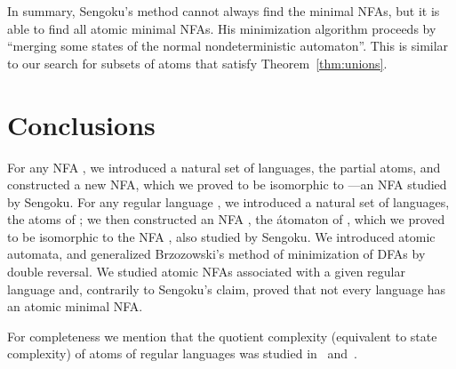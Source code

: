 \documentclass[preprint,12pt]{elsarticle}
\begin{document}
\vskip-0.1cm
In summary, Sengoku's method cannot always find the minimal NFAs, but 
 it is able to find all atomic minimal NFAs.
His minimization algorithm proceeds by 
``merging some states of the normal nondeterministic automaton''.
This is similar to our search for subsets of atoms that satisfy 
Theorem~\ref{thm:unions}.

\section{Conclusions}
\label{sec:conc}
For any NFA , we introduced a natural set of languages, the partial atoms, and constructed a new NFA, which we proved to be isomorphic to ---an NFA studied by Sengoku.
For any regular language , we introduced a natural set of languages, the atoms of ; we then constructed an NFA , the \'atomaton of , which we proved to be isomorphic to the NFA , also studied by Sengoku.
 We  introduced atomic automata, and generalized 
Brzozowski's method of minimization of DFAs by double reversal.
We studied atomic NFAs associated with a given regular language and,
contrarily to Sengoku's claim, proved that not every language has an atomic 
minimal NFA.

For completeness we mention that the quotient complexity (equivalent to 
state complexity) of atoms of regular languages was studied in~\cite{BrTa13} and~\cite{BrDa13}. 
\end{document}
